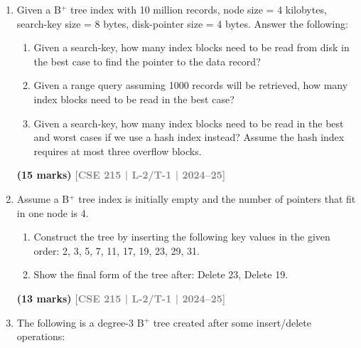 \documentclass[12pt,a3paper]{article}
\newcommand{\yr}[1]{\hfill\textcolor{gray}{\small\textbf{[#1]}}}
\newcommand{\mk}[1]{\textcolor{orange!70!black}{\small\textbf{(#1 marks)}}}
\begin{document}
\begin{enumerate}

\item Given a B$^+$ tree index with 10 million records, node size = 4 kilobytes, search-key size = 8 bytes, disk-pointer size = 4 bytes. Answer the following:
\begin{enumerate}
  \item Given a search-key, how many index blocks need to be read from disk in the best case to find the pointer to the data record?
  \item Given a range query assuming 1000 records will be retrieved, how many index blocks need to be read in the best case?
  \item Given a search-key, how many index blocks need to be read in the best and worst cases if we use a hash index instead? Assume the hash index requires at most three overflow blocks.
\end{enumerate}
\mk{15} \yr{CSE 215 | L-2/T-1 | 2024--25}

\item Assume a B$^+$ tree index is initially empty and the number of pointers that fit in one node is 4.
\begin{enumerate}
  \item Construct the tree by inserting the following key values in the given order: 2, 3, 5, 7, 11, 17, 19, 23, 29, 31.
  \item Show the final form of the tree after: Delete 23, Delete 19.
\end{enumerate}
\mk{13} \yr{CSE 215 | L-2/T-1 | 2024--25}

\item The following is a degree-3 B$^+$ tree created after some insert/delete operations:
\begin{center}

\end{center}
\end{enumerate}
\end{document}

